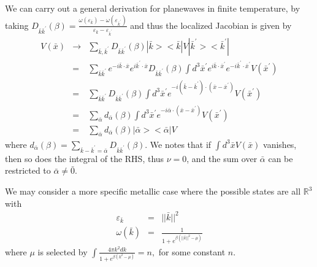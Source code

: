 \documentclass{article}
\newcommand{\beas}{\begin{eqnarray*}}
\newcommand{\enas}{\end{eqnarray*}}
\newcommand{\reals}{\mathbb{R}}
\begin{document}
We can carry out a general derivation for planewaves in finite
temperature, by taking $D_{\bar{k}\bar{k}^\prime}(\beta) =
 \frac{\omega(\varepsilon_{\bar{k}})-\omega(\varepsilon_{\bar{k}^\prime})}
      {\varepsilon_{\bar{k}}-\varepsilon_{\bar{k}^\prime}}$
and thus the localized Jacobian is given by
\beas
  V(\bar{x}) &\rightarrow&
    \sum_{\bar{k},\bar{k}^\prime} D_{\bar{k}\bar{k}^\prime}(\beta)
    |\bar{k}><\bar{k}| V |\bar{k}^\prime><\bar{k}^\prime|\\
  &=&
  \sum_{\bar{k}\bar{k}^\prime}
  e^{-i\bar{k}\cdot \bar{x}}  e^{i\bar{k}^\prime \cdot \bar{x}}
  D_{\bar{k}\bar{k}^\prime}(\beta)
  \int d^3 \bar{x}^\prime
  e^{ i\bar{k}\cdot \bar{x}^\prime}  e^{-i\bar{k}^\prime \cdot \bar{x}^\prime}
  V(\bar{x}^\prime)\\
  &=&
  \sum_{\bar{k}\bar{k}^\prime}
  D_{\bar{k}\bar{k}^\prime}(\beta)
  \int d^3 \bar{x}^\prime
  e^{-i (\bar{k}-\bar{k}^\prime) \cdot (\bar{x}-\bar{x}^\prime)}
  V(\bar{x}^\prime)\\
  &=&
  \sum_{\bar{\alpha}}
  d_{\bar{\alpha}}(\beta)
  \int d^3 \bar{x}^\prime
  e^{-i \bar{\alpha} \cdot (\bar{x}-\bar{x}^\prime)}
  V(\bar{x}^\prime)\\
  &=&
  \sum_{\bar{\alpha}}
  d_{\bar{\alpha}}(\beta)
  |\bar{\alpha}><\bar{\alpha}|
  V
\enas
where $d_{\bar{\alpha}}(\beta) =
  \sum_{\bar{k}-\bar{k}^\prime = \bar{\alpha}}
  D_{\bar{k}\bar{k}^\prime}(\beta)$.  We notes that if
$\int d^3 \bar{x} V(\bar{x})$ vanishes, then so does the 
integral of the RHS, thus $\nu = 0$, and the sum over $\bar{\alpha}$
can be restricted to $\bar{\alpha} \ne \bar{0}$.

We may consider a more specific metallic case where
the possible states are all $\reals^3$ with
\beas
\varepsilon_{\bar{k}} &=& ||\bar{k}||^2\\
\omega(\bar{k}) &=& \frac{1}{1 + e^{\beta(||\bar{k}||^2 - \mu)}}
\enas
where $\mu$ is selected by
$
\int \frac{4 \pi k^2 dk}{1 + e^{\beta(k^2 - \mu)}} = n,
$
for some constant $n$.
\end{document}
